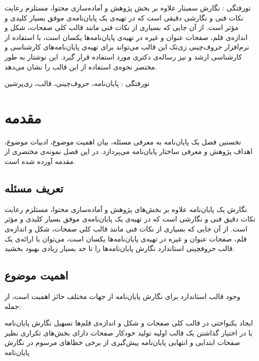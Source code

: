
‌تورفتگی : نگارش سمینار‌ علاوه بر بخش پژوهش و آماده‌سازی محتوا،
مستلزم رعایت نکات فنی و نگارشی دقیقی است 
که در تهیه‌ی یک پایان‌نامه‌ی موفق بسیار کلیدی و مؤثر است.
از آن جایی که بسیاری از نکات فنی مانند قالب کلی صفحات، شکل و اندازه‌ی قلم، صفحات عنوان و غیره در تهیه‌ی پایان‌نامه‌ها یکسان است، با استفاده از نرم‌افزار حروف‌چینی زی‌تک %
این قالب می‌تواند برای تهیه‌ی پایان‌نامه‌های کارشناسی و کارشناسی ارشد و نیز رساله‌ی دکتری مورد استفاده قرار گیرد.
این نوشتار به طور مختصر نحوه‌ی استفاده از این قالب را نشان می‌دهد.


‌تورفتگی : 
پایان‌نامه، حروف‌چینی، قالب، زی‌پرشین

\section{مقدمه}

نخستین فصل یک پایان‌نامه به معرفی مسئله، بیان اهمیت موضوع، ادبیات موضوع،
اهداف پژوهش و معرفی ساختار پایان‌نامه می‌پردازد.
در این فصل نمونه‌ی مختصری از مقدمه آورده شده است.

\subsection{تعریف مسئله}

نگارش یک پایان‌نامه‌ علاوه بر بخش‌های پژوهش و آماده‌سازی محتوا،
مستلزم رعایت نکات دقیق فنی و نگارشی است 
که در تهیه‌ی یک پایان‌نامه‌ی موفق بسیار کلیدی و مؤثر است.
از آن جایی که بسیاری از نکات فنی مانند قالب کلی صفحات، شکل و اندازه‌ی قلم، 
صفحات عنوان و غیره در تهیه‌ی پایان‌نامه‌ها یکسان است،
می‌توان با ارائه‌ی یک قالب حروفچینی استاندارد 
نگارش پایان‌نامه‌ها را تا حد بسیار زیادی بهبود بخشید.


\subsection{اهمیت موضوع}

وجود قالب استاندارد برای نگارش پایان‌نامه از جهات مختلف حائز اهمیت است، از جمله:

 ایجاد یکنواختی در قالب کلی صفحات و شکل و اندازه‌ی قلم‌ها
 تسهیل نگارش پایان‌نامه با در اختیار گذاشتن یک قالب اولیه 
 تولید خودکار صفحات دارای بخش‌های تکراری نظیر صفحات ابتدایی و انتهایی پایان‌نامه
 پیش‌گیری از برخی خطاهای مرسوم در نگارش پایان‌نامه

